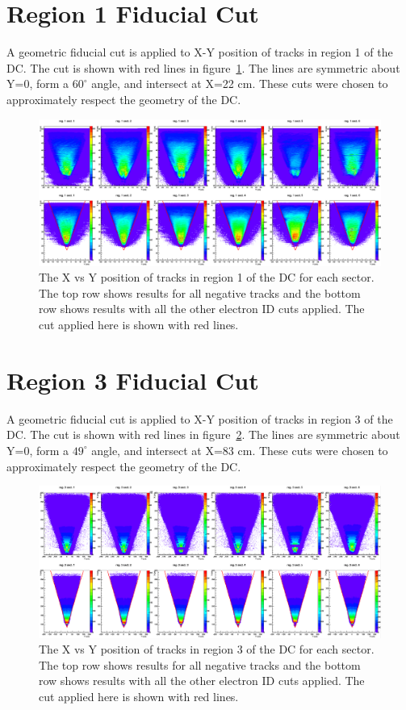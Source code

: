 \section{Region 1 Fiducial Cut}
\label{sec:R1fid}
%
A geometric fiducial cut is applied to X-Y position of tracks in region 1 of the DC.
The cut is shown with red lines in figure~\ref{fig:R1fid_c0c1_6sects}.
The lines are symmetric about Y=0, form a $60^\circ$ angle, and intersect at X=22 cm.
These cuts were chosen to approximately respect the geometry of the DC.
%
\begin{figure}
\centering
\includegraphics[width=8.5in]{figures/R1fid_c0c1_6sects.png}
\caption{The X vs Y position of tracks in region 1 of the DC for each sector. The top row shows results for all negative tracks and the bottom row shows results with all the other electron ID cuts applied. The cut applied here is shown with red lines.}
\label{fig:R1fid_c0c1_6sects}
\end{figure}
%
%
\section{Region 3 Fiducial Cut}
\label{sec:R3fid}
%
A geometric fiducial cut is applied to X-Y position of tracks in region 3 of the DC.
The cut is shown with red lines in figure~\ref{fig:R3fid_c0c1_6sects}.
The lines are symmetric about Y=0, form a $49^\circ$ angle, and intersect at X=83 cm.
These cuts were chosen to approximately respect the geometry of the DC.
%
\begin{figure}
\centering
\includegraphics[width=8.5in]{figures/R3fid_c0c1_6sects.png}
\caption{The X vs Y position of tracks in region 3 of the DC for each sector. The top row shows results for all negative tracks and the bottom row shows results with all the other electron ID cuts applied. The cut applied here is shown with red lines.}
\label{fig:R3fid_c0c1_6sects}
\end{figure}
%

